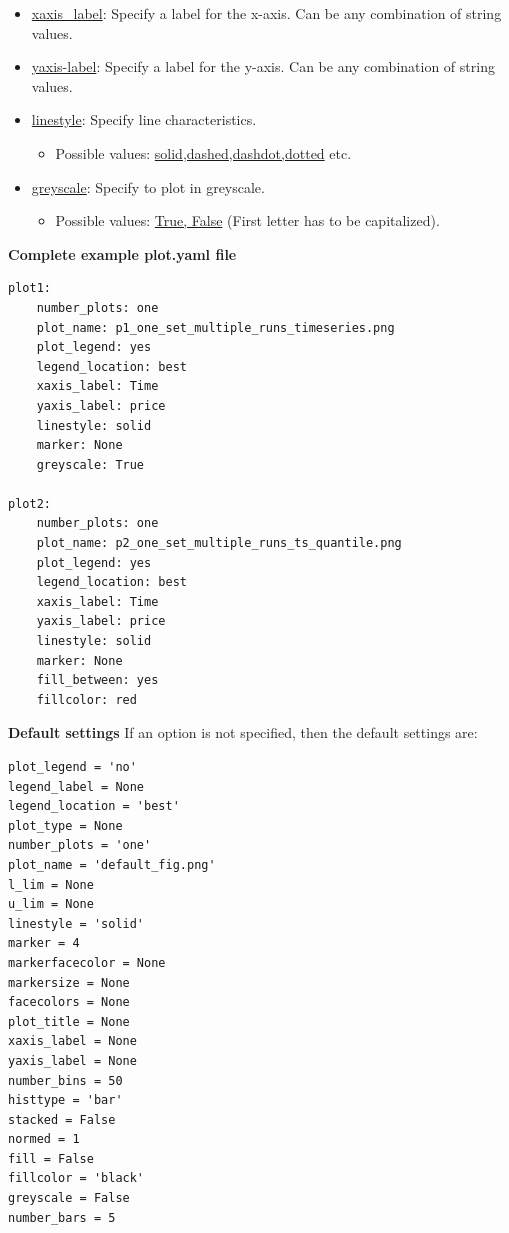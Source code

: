 \documentclass[10pt,a4paper]{article}
\begin{document}
\begin{itemize}
\item \url{xaxis_label}: Specify a label for the x-axis. Can be any combination of string values.

\item \url{yaxis-label}: Specify a label for the y-axis. Can be any combination of string values.

\item \url{linestyle}: Specify line characteristics. 

\begin{itemize}
\item Possible values: \url{solid,dashed,dashdot,dotted} etc.
\end{itemize}

\item \url{greyscale}: Specify to plot in greyscale.

\begin{itemize}
\item Possible values: \url{True, False} (First letter has to be capitalized).
\end{itemize}
\end{itemize}

\bigskip
\textbf{Complete example plot.yaml file}

\begin{lstlisting}
plot1:
    number_plots: one
    plot_name: p1_one_set_multiple_runs_timeseries.png
    plot_legend: yes
    legend_location: best
    xaxis_label: Time
    yaxis_label: price
    linestyle: solid
    marker: None
    greyscale: True

plot2:
    number_plots: one
    plot_name: p2_one_set_multiple_runs_ts_quantile.png
    plot_legend: yes
    legend_location: best
    xaxis_label: Time
    yaxis_label: price
    linestyle: solid
    marker: None
    fill_between: yes
    fillcolor: red
\end{lstlisting}


\bigskip
\textbf{Default settings}
If an option is not specified, then the default settings are:

\begin{lstlisting}
plot_legend = 'no'
legend_label = None
legend_location = 'best'
plot_type = None
number_plots = 'one'
plot_name = 'default_fig.png'
l_lim = None
u_lim = None
linestyle = 'solid'
marker = 4
markerfacecolor = None
markersize = None
facecolors = None
plot_title = None
xaxis_label = None
yaxis_label = None
number_bins = 50
histtype = 'bar'
stacked = False
normed = 1
fill = False
fillcolor = 'black'
greyscale = False
number_bars = 5
\end{lstlisting}
\end{document}

